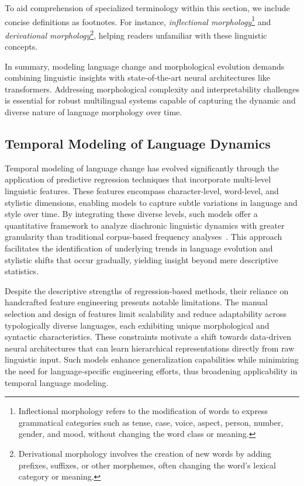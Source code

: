 \documentclass[sigconf]{acmart}
\begin{document}
To aid comprehension of specialized terminology within this section, we include concise definitions as footnotes. For instance, \textit{inflectional morphology}\footnote{Inflectional morphology refers to the modification of words to express grammatical categories such as tense, case, voice, aspect, person, number, gender, and mood, without changing the word class or meaning.} and \textit{derivational morphology}\footnote{Derivational morphology involves the creation of new words by adding prefixes, suffixes, or other morphemes, often changing the word’s lexical category or meaning.}, helping readers unfamiliar with these linguistic concepts.

In summary, modeling language change and morphological evolution demands combining linguistic insights with state-of-the-art neural architectures like transformers. Addressing morphological complexity and interpretability challenges is essential for robust multilingual systems capable of capturing the dynamic and diverse nature of language morphology over time.

\subsection{Temporal Modeling of Language Dynamics}

Temporal modeling of language change has evolved significantly through the application of predictive regression techniques that incorporate multi-level linguistic features. These features encompass character-level, word-level, and stylistic dimensions, enabling models to capture subtle variations in language and style over time. By integrating these diverse levels, such models offer a quantitative framework to analyze diachronic linguistic dynamics with greater granularity than traditional corpus-based frequency analyses~\cite{ref41}. This approach facilitates the identification of underlying trends in language evolution and stylistic shifts that occur gradually, yielding insight beyond mere descriptive statistics.

Despite the descriptive strengths of regression-based methods, their reliance on handcrafted feature engineering presents notable limitations. The manual selection and design of features limit scalability and reduce adaptability across typologically diverse languages, each exhibiting unique morphological and syntactic characteristics. These constraints motivate a shift towards data-driven neural architectures that can learn hierarchical representations directly from raw linguistic input. Such models enhance generalization capabilities while minimizing the need for language-specific engineering efforts, thus broadening applicability in temporal language modeling.
\end{document}
